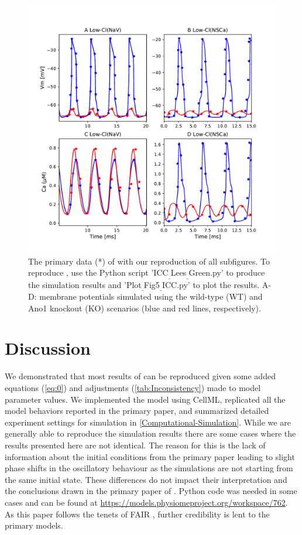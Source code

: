 \documentclass[fleqn,10pt]{physiome}
\begin{document}
\begin{figure}[ht!]%
\includegraphics[width=1\linewidth]{Figure5.pdf}
\caption{The primary data (*) of  \cite[Figure 5]{lees2014computational} with our reproduction of all subfigures. To reproduce \cite[Figure 5]{lees2014computational}, use the Python script 'ICC$_{\_}$Lees$_{\_}$Green.py' to produce the simulation results and 'Plot$_{\_}$Fig5$_{\_}$ICC.py' to plot the results. A-D: membrane potentials simulated using the wild-type (WT) and Ano1 knockout (KO) scenarios (blue and red lines, respectively).}
\label{fig:fig5}
\end{figure}



\section{Discussion}
We demonstrated that most results of \citet{lees2014computational} can be reproduced given some added equations (\autoref{eq:0}) and adjustments (\autoref{tab:Inconsistency}) made to model parameter values. We implemented the model \citep{lees2014computational} using CellML, replicated all the model behaviors reported in the primary paper, and summarized detailed
experiment settings for simulation in \autoref{Computational-Simulation}. While we are generally able to reproduce the simulation results there are some cases where the results presented here are not identical. The reason for this is the lack of information about the initial conditions from the primary paper leading to slight phase shifts in the oscillatory behaviour as the simulations are not starting from the same initial state. These differences do not impact their interpretation and the conclusions drawn in the primary paper of \citet{lees2014computational}.
Python code was needed in some cases and can be found at \url{https://models.physiomeproject.org/workspace/762}. 
As this paper follows the tenets of FAIR \citep{wilkinson2016fair}, further credibility is lent to the primary models.
\end{document}
